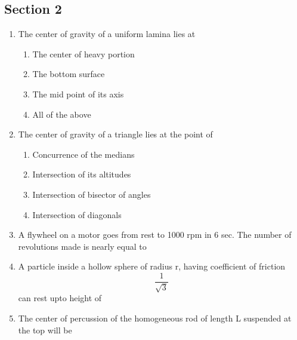 \documentclass[11pt,a4paper]{article}
\begin{document}
\subsection*{Section 2}
\begin{enumerate}
\item{The center of gravity of a uniform lamina lies at}
\begin{enumerate}[label=\Alph*.]
\item{The center of heavy portion}
\item{The bottom surface}
\item{The mid point of its axis}
\item{All of the above}
\end{enumerate}
\item{The center of gravity of a triangle lies at the point of}
\begin{enumerate}[label=\Alph*.]
\item{Concurrence of the medians}
\item{Intersection of its altitudes}
\item{Intersection of bisector of angles}
\item{Intersection of diagonals}
\end{enumerate}
\item{A flywheel on a motor goes from rest to 1000 rpm in 6 sec. The number of revolutions made is nearly equal to}
\\
\item{A particle inside a hollow sphere of radius r, having coefficient of friction $$\frac{1}{{\sqrt 3 }}$$ can rest upto height of}
\\
\item{The center of percussion of the homogeneous rod of length L suspended at the top will be}

\end{enumerate}
\end{document}
